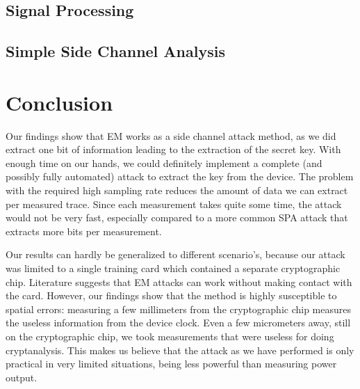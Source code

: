 \documentclass{llncs}
\begin{document}
\subsection{Signal Processing}




\subsection{Simple Side Channel Analysis}




\section{Conclusion}

Our findings show that EM works as a side channel attack method, as we did
extract one bit of information leading to the extraction of the secret key.
With enough time on our hands, we could definitely implement a complete (and
possibly fully automated) attack to extract the key from the device. The
problem with the required high sampling rate reduces the amount of data we can
extract per measured trace. Since each measurement takes quite some time, the
attack would not be very fast, especially compared to a more common SPA attack
that extracts more bits per measurement.

Our results can hardly be generalized to different scenario's, because our
attack was limited to a single training card which contained a separate
cryptographic chip. Literature suggests that EM attacks can work without making
contact with the card. However, our findings show that the method is highly
susceptible to spatial errors: measuring a few millimeters from the
cryptographic chip measures the useless information from the device clock. Even
a few micrometers away, still on the cryptographic chip, we took measurements
that were useless for doing cryptanalysis. This makes us believe that the
attack as we have performed is only practical in very limited situations, being
less powerful than measuring power output.




% 
% 
% 
% 
\end{document}
